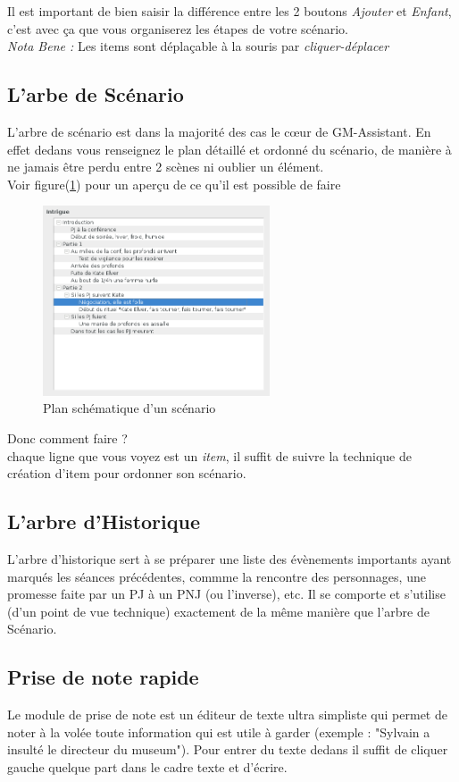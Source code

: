 \documentclass[a4paper,12pt]{article}
\newcommand*{\GMA}{GM-Assistant\xspace}
\begin{document}
Il est important de bien saisir la différence entre les 2 boutons \emph{Ajouter} et \emph{Enfant}, c'est avec ça que vous organiserez les étapes de votre scénario.
\\
\emph{Nota Bene :} Les items sont déplaçable à la souris par \emph{cliquer-déplacer}

\subsection{L'arbe de Scénario}\label{scenario}
L'arbre de scénario est dans la majorité des cas le cœur de \GMA. En effet dedans vous renseignez le plan détaillé et ordonné du scénario, de manière à ne jamais être perdu entre 2 scènes ni oublier un élément.
\\
Voir figure(\ref{arbre_scenar}) pour un aperçu de ce qu'il est possible de faire
\begin{figure}[h]
    \includegraphics[width=0.6\textwidth]{scenario_type}
    \caption{Plan schématique d'un scénario}
    \label{arbre_scenar}
\end{figure}
Donc comment faire ?
\\
chaque ligne que vous voyez est un \emph{item}, il suffit de suivre la technique de création d'item pour ordonner son scénario.
\subsection{L'arbre d'Historique}\label{historique}
L'arbre d'historique sert à se préparer une liste des évènements importants ayant marqués les séances précédentes, commme la rencontre des personnages, une promesse faite par un PJ à un PNJ (ou l'inverse), etc.
Il se comporte et s'utilise (d'un point de vue technique) exactement de la même manière que l'arbre de Scénario.


\subsection{Prise de note rapide}
Le module de prise de note est un éditeur de texte ultra simpliste qui permet de noter à la volée toute information qui est utile à garder (exemple : "Sylvain a insulté le directeur du museum"). Pour entrer du texte dedans il suffit de cliquer gauche quelque part dans le cadre texte et d'écrire.
\\
\end{document}
